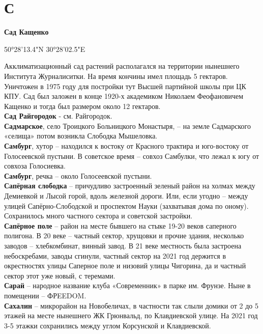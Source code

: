 \chapter*{С}

\textbf{Сад Кащенко}

50°28'13.4"N 30°28'02.5"E

Акклиматизационный сад растений располагался на территории нынешнего Института Журналиситки. На время кончины имел площадь 5 гектаров. Уничтожен в 1975 году для постройки тут Высшей партийной школы при ЦК КПУ. Сад был заложен в конце 1920-х академиком Николаем Феофановичем Кащенко и тогда был размером около 12 гектаров.\\

\textbf{Сад Райгородок} - см. Райгородок.\\

\textbf{Садмарское}, село Троицкого Больницкого Монастыря, – на земле Садмарского «селища» потом возникла Слободка Мышеловка.\\

\textbf{Самбург}, хутор – находился к востоку от Красного трактира и юго-востоку от Голосеевской пустыни. В советское время – совхоз Самбулки, что лежал к югу от совхоза Голосиевка.\\

\textbf{Самбург}, речка – около Голосеевской пустыни.\\

\textbf{Сапёрная слободка} – причудливо застроенный зеленый район на холмах между Демиевкой и Лысой горой, вдоль железной дороги. Или, если угодно – между улицей Сапёрно-Слободской и проспектом Науки (захватывая дома по оному). Сохранилось много частного сектора и советской застройки.\\

\textbf{Сапёрное поле} – район на месте бывшего на стыке 19-20 веков саперного полигона. В 20 веке – частный сектор, хрущовки и прочие здания, несколько заводов – хлебкомбинат, винный завод. В 21 веке местность была застроена небоскребами, заводы сгинули, частный сектор на 2021 год держится в окрестностях улицы Саперное поле и низовий улицы Чигорина, да и частный сектор этот уже новый, с теремами.\\

\textbf{Сарай} – народное название клуба «Современник» в парке им. Фрунзе. Ныне в помещении – ФРEEDOM.\\

\textbf{Сахалин} – микрорайон на Новобеличах, в частности так слыли домики от 2 до 5 этажей на месте нынешнего ЖК Грюнвальд, по Клавдиевской улице. На 2021 год 3-5 этажки сохранились между углом Корсунской и Клавдиевской.

